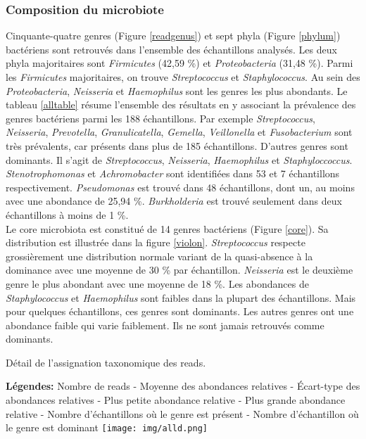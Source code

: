 \documentclass[12pt,a4paper]{article}
\begin{document}
\subsubsection{Composition du microbiote}
Cinquante-quatre genres (Figure \ref{readgenus}) et sept phyla (Figure \ref{phylum}) bactériens sont retrouvés dans l'ensemble des échantillons analysés.
Les deux phyla majoritaires sont \textit{Firmicutes} (42,59 \%) et \textit{Proteobacteria} (31,48 \%). Parmi les \textit{Firmicutes} majoritaires, on trouve \textit{Streptococcus} et \textit{Staphylococcus}. Au sein des \textit{Proteobacteria}, \textit{Neisseria} et \textit{Haemophilus} sont les genres les plus abondants.
Le tableau \ref{alltable} résume l'ensemble des résultats en y associant la prévalence des genres bactériens parmi les 188 échantillons.
Par exemple \textit{Streptococcus}, \textit{Neisseria}, \textit{Prevotella}, \textit{Granulicatella}, \textit{Gemella}, \textit{Veillonella} et \textit{Fusobacterium} sont très prévalents, car présents dans plus de 185 échantillons.
D’autres genres sont dominants. Il s’agit de \textit{Streptococcus}, \textit{Neisseria}, \textit{Haemophilus} et \textit{Staphyloccoccus}. \textit{Stenotrophomonas} et \textit{Achromobacter} sont identifiées dans 53 et 7 échantillons respectivement. \textit{Pseudomonas} est trouvé dans 48 échantillons, dont un, au moins avec une abondance de 25,94 \%. \textit{Burkholderia} est trouvé seulement dans deux échantillons à moins de 1 \%.\\
Le core microbiota est constitué de 14 genres bactériens (Figure \ref{core}). Sa distribution est illustrée dans la figure \ref{violon}.
\textit{Streptococcus} respecte grossièrement une distribution normale variant de la quasi-absence à la dominance avec une moyenne de 30 \% par échantillon. \textit{Neisseria} est le deuxième genre le plus abondant avec une moyenne de 18 \%.
Les abondances de \textit{Staphylococcus} et \textit{Haemophilus} sont faibles dans la plupart des échantillons. Mais pour quelques échantillons, ces genres sont dominants. Les autres genres ont une abondance faible qui varie faiblement. Ils ne sont jamais retrouvés comme dominants.


\begin{table}[H]
\begin{center}
\caption{Détail de l'assignation taxonomique des reads.} \textbf{Légendes:} Nombre de reads - Moyenne des abondances relatives - Écart-type des abondances relatives - Plus petite abondance relative - Plus grande abondance relative - Nombre d'échantillons où le genre est présent - Nombre d'échantillon où le genre est dominant
\label{alltable}
\hspace*{-2.8cm}
\texttt{[image: img/alld.png]}\hfill
\end{center}

\end{table}
\end{document}
